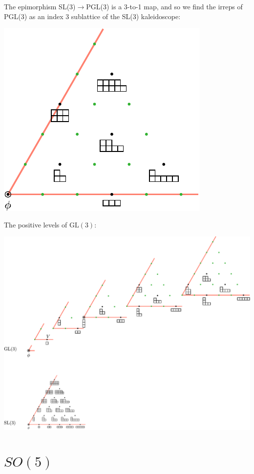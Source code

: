 \documentclass[11pt,oneside]{article}
\newcommand{\GL}{\mathrm{GL}}
\begin{document}
The epimorphism SL(3)$\to$PGL(3) is a 3-to-1 map,
and so we find the irreps of PGL(3) as an index 3 
sublattice of the SL(3) kaleidoscope:
\begin{center}
\includegraphics[scale=0.8]{images/pgl3.pdf}
\end{center}

The positive levels of $\GL(3)$:
\begin{center}
\includegraphics[scale=0.6]{images/gl3.pdf}
\end{center}

\section{$SO(5)$}
\end{document}
